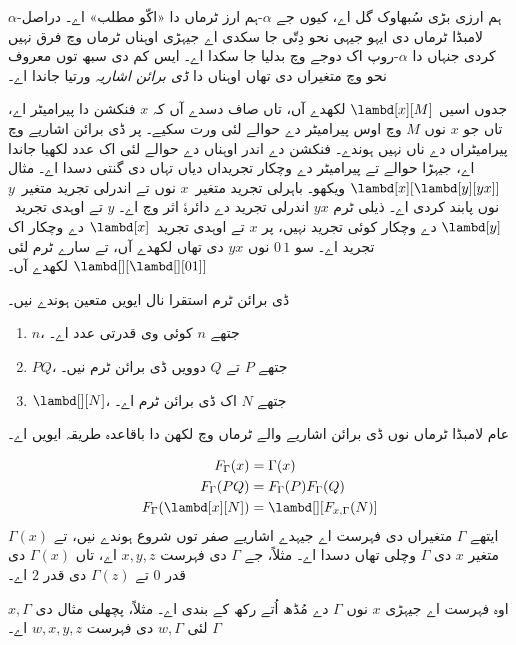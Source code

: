 \documentclass[../../../include/open-logic-section]{subfiles}
\begin{document}


$\alpha$-ہم ارزی بڑی سُبھاوک گل اے، کیوں جے
$\alpha$-ہم ارز ٹرماں دا «اکّو مطلب» اے۔ دراصل لامبڈا
ٹرماں دی ایہو جیہی نحو دِتّی جا سکدی اے جیہڑی اوہناں ٹرماں
وچ فرق نہیں کردی جنہاں دا $\alpha$-روپ اک دوجے وچ بدلیا جا
سکدا اے۔ ایس کم دی سبھ توں معروف نحو وچ متغیراں دی تھاں
اوہناں دا \emph{ڈی برائن اشاریہ} ورتیا جاندا اے۔

جدوں اسیں $\lambd[x][M]$ لکھدے آں، تاں صاف دسدے آں کہ
$x$ فنکشن دا پیرامیٹر اے، تاں جو $x$ نوں $M$ وچ اوس
پیرامیٹر دے حوالے لئی ورت سکیے۔ پر ڈی برائن اشاریے وچ
پیرامیٹراں دے ناں نہیں ہوندے۔ فنکشن دے اندر اوہناں دے حوالے
لئی اک عدد لکھیا جاندا اے، جیہڑا حوالے تے پیرامیٹر دے
وچکار تجریداں دیاں تہاں دی گنتی دسدا اے۔ مثال $\lambd[x][\lambd[y][y x]]$
ویکھو۔ باہرلی تجرید متغیر~$x$ نوں تے اندرلی تجرید متغیر~$y$
نوں پابند کردی اے۔ ذیلی ٹرم $y x$ اندرلی تجرید دے دائرۂ اثر
وچ اے۔ $y$ تے اوہدی تجرید~$\lambd[y]$ دے وچکار کوئی تجرید
نہیں، پر $x$ تے اوہدی تجرید~$\lambd[x]$ دے وچکار اک تجرید
اے۔ سو $0\, 1$ نوں $y x$ دی تھاں لکھدے آں، تے سارے ٹرم
لئی $\lambd[][\lambd[][01]]$ لکھدے آں۔

\begin{defn}
  ڈی برائن ٹرم استقرا نال ایویں متعین ہوندے نیں۔
  \begin{enumerate}
  \item $n$، جتھے $n$ کوئی وی قدرتی عدد اے۔
  \item $PQ$، جتھے $P$ تے $Q$ دوویں ڈی برائن ٹرم نیں۔
  \item $\lambd[][N]$، جتھے $N$ اک ڈی برائن ٹرم اے۔
  \end{enumerate}
\end{defn}

عام لامبڈا ٹرماں نوں ڈی برائن اشاریے والے ٹرماں وچ لکھن دا
باقاعدہ طریقہ ایویں اے۔
\begin{defn}
  \begin{align*}
    F_\Gamma(x) &= \Gamma(x) \\
    F_\Gamma(PQ) &= F_\Gamma(P)F_\Gamma(Q) \\
    F_\Gamma(\lambd[x][N]) &= \lambd[][F_{x,\Gamma}(N)]
  \end{align*}
  ایتھے $\Gamma$ متغیراں دی فہرست اے جیہدے اشاریے صفر توں
  شروع ہوندے نیں، تے $\Gamma(x)$ متغیر $x$ دی $\Gamma$ وچلی
  تھاں دسدا اے۔ مثلاً، جے $\Gamma$ دی فہرست $x,y,z$ اے، تاں
  $\Gamma(x)$ دی قدر $0$ تے $\Gamma(z)$ دی قدر $2$ اے۔

  $x,\Gamma$ اوہ فہرست اے جیہڑی $x$ نوں $\Gamma$ دے مُڈھ
  اُتے رکھ کے بندی اے۔ مثلاً، پچھلی مثال دی $\Gamma$ لئی
  $w,\Gamma$ دی فہرست $w,x,y,z$ اے۔
\end{defn}
\end{document}
